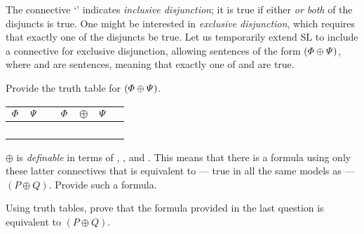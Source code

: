 The connective `\eor' indicates \emph{inclusive disjunction}; it is true if either \emph{or both} of the disjuncts is true. One might be interested in \emph{exclusive disjunction}, which requires that exactly one of the disjuncts be true. Let us temporarily extend SL to include a connective for exclusive disjunction, allowing sentences of the form $(\varPhi{} \oplus \varPsi{})$, where \metaA{} and \metaB{} are sentences, meaning that exactly one of \metaA{} and \metaB{} are true.
	\begin{earg}
		\item Provide the truth table for $(\varPhi{} \oplus \varPsi{})$.
		
		
		\begin{tabular}{@{ }c@{ }@{ }c | c@{ }@{ }c@{ }@{ }c@{ }@{ }c@{ }@{ }c}
$\varPhi{}$ & $\varPsi{}$ &  & $\varPhi{}$ & $\oplus$ & $\varPsi{}$ & \\
\hline 
 &  &  &  &  & & \\
 &  &  &  &  &  & \\
 &  &  &  &  &  & \\
 &  &  &  &  &  & \\
\end{tabular}
		
		
		
		
		\item $\oplus$ is \emph{definable} in terms of \eor, \eand, and \enot. This means that there is a formula using only these latter connectives that is equivalent to --- true in all the same models as --- $(P \oplus Q)$. Provide such a formula.
		\item Using truth tables, prove that the formula provided in the last question is equivalent to $(P \oplus Q)$.
	\end{earg}


\fi